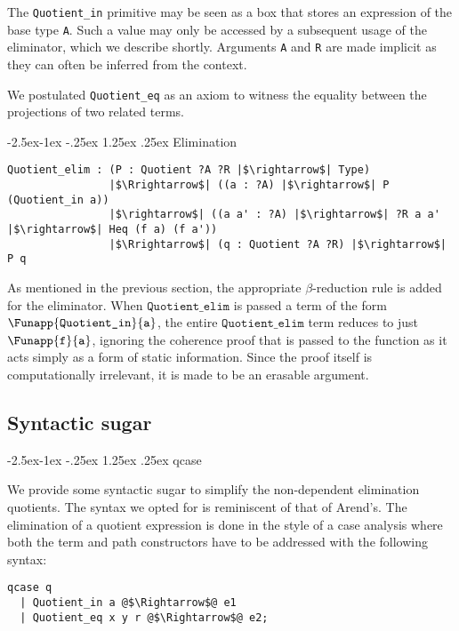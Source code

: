 \documentclass[12pt,twoside,maitrise]{dms}
\makeatletter
\theoremstyle{definition}
\numberwithin{equation}{section}
\numberwithin{table}{chapter}
\numberwithin{figure}{chapter}
\newcommand\id[1] {\texttt{#1}}
\renewcommand\paragraph{\@startsection{paragraph}{4}{\z@}%
            {-2.5ex\@plus -1ex \@minus -.25ex}%
            {1.25ex \@plus .25ex}%
            {\normalfont\normalsize\bfseries}}
\makeatother
\begin{document}
The \id{Quotient\_in} primitive may be seen as a box that stores an expression
of the base type \id{A}. Such a value may only be accessed by a subsequent usage
of the eliminator, which we describe shortly. Arguments \id{A} and \id{R} are
made implicit as they can often be inferred from the context.

We postulated \id{Quotient\_eq} as an axiom to witness the equality between the
projections of two related terms.

\paragraph{Elimination}

\begin{verbatim}
Quotient_elim : (P : Quotient ?A ?R |$\rightarrow$| Type)
                |$\Rrightarrow$| ((a : ?A) |$\rightarrow$| P (Quotient_in a))
                |$\rightarrow$| ((a a' : ?A) |$\rightarrow$| ?R a a' |$\rightarrow$| Heq (f a) (f a'))
                |$\Rrightarrow$| (q : Quotient ?A ?R) |$\rightarrow$| P q
\end{verbatim}

As mentioned in the previous section, the appropriate $\beta$-reduction rule is
added for the eliminator. When $\id{Quotient\_elim}$ is passed a term of the
form $\Funapp{\id{Quotient\_in}}{\id{a}}$, the entire $\id{Quotient\_elim}$ term
reduces to just $\Funapp{\id{f}}{\id{a}}$, ignoring the coherence proof that is
passed to the function as it acts simply as a form of static information. Since
the proof itself is computationally irrelevant, it is made to be an erasable
argument.

\subsection{Syntactic sugar}

\paragraph{qcase}

We provide some syntactic sugar to simplify the non-dependent elimination
quotients. The syntax we opted for is reminiscent of that of
Arend's\cite{arend}. The elimination of a quotient expression is done in the
style of a case analysis where both the term and path constructors have to be
addressed with the following syntax:

\begin{verbatim}
qcase q
  | Quotient_in a @$\Rightarrow$@ e1
  | Quotient_eq x y r @$\Rightarrow$@ e2;
\end{verbatim}
\end{document}
